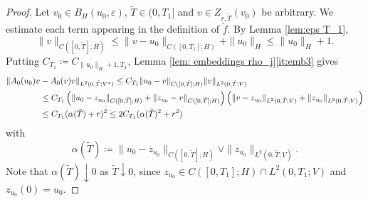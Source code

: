 \documentclass{amsart}
\newcommand{\<}{\langle}
\newcommand{\?}{\rangle}
\theoremstyle{plain}
\theoremstyle{remark}
\theoremstyle{plain}
\numberwithin{equation}{section}
\newcommand{\eps}{\varepsilon}
\begin{document}
\begin{proof}
Let  $v_0\in B_H(u_0,\eps)$, $\tilde{T}\in(0,T_1]$ and $v\in Z_{r,\tilde{T}}(v_0)$ be arbitrary. We estimate each term appearing in the definition of $\tilde{f}$. By Lemma \ref{lem:eps T_1},
\begin{equation}\label{eq: v estimate}
\|v\|_{C([0,\tilde{T}];H)}\leq \|v-u_0\|_{C([0,T_1];H)}+\|u_0\|_H\leq \|u_0\|_H+1.
\end{equation}
Putting $C_{T_1}\coloneqq C_{\|u_0\|_H+1,T_1}$, Lemma \ref{lem: embeddings rho_j}\ref{it:emb3} gives
\begin{align}
\|A_0(u_0)v&-A_0(v)v\|_{L^2(0,\tilde{T};V^*)}\leq C_{T_1}\|u_0-v\|_{C([0,\tilde{T}];H)}\|v\|_{L^2(0,\tilde{T};V)}\notag\\
&\leq C_{T_1}\left(\|u_0-z_{u_0}\|_{C([0,\tilde{T}];H)}+\|z_{u_0}-v\|_{C([0,\tilde{T}];H)}\right)\left(\|v-z_{u_0}\|_{L^2(0,\tilde{T};V)}+\|z_{u_0}\|_{L^2(0,\tilde{T};V)}\right)\notag\\
&\leq C_{T_1}(\alpha(\tilde{T})+r)^2  \leq 2C_{T_1}(\alpha(\tilde{T})^2+r^2)\label{eq: estimate A_0}
\end{align}
with
\[
\alpha(\tilde{T})\coloneqq \|u_0-z_{u_0}\|_{C([0,\tilde{T}];H)}\vee\|z_{u_0}\|_{L^2(0,\tilde{T};V)}.
\]
Note that $\alpha(\tilde{T})\downarrow 0$ as $\tilde{T}\downarrow 0$, since $z_{u_0}\in C([0,T_1];H)\cap L^2(0,T_1;V)$ and $z_{u_0}(0)=u_0$.


\end{proof}
\end{document}

